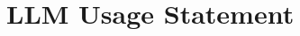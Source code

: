 

\maketitle

\clearpage
\section*{LLM Usage Statement}
\label{page:llm-usage-statement}

\label{page:references}
{\small


}

